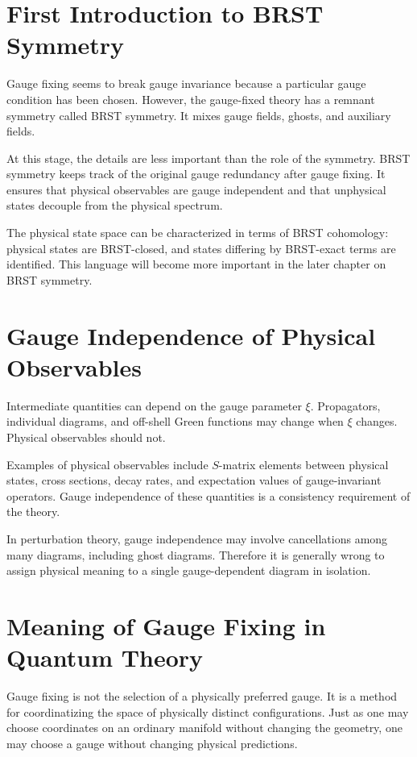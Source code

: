 \section{First Introduction to BRST Symmetry}

Gauge fixing seems to break gauge invariance because a particular gauge
condition has been chosen. However, the gauge-fixed theory has a remnant symmetry
called BRST symmetry. It mixes gauge fields, ghosts, and auxiliary fields.

At this stage, the details are less important than the role of the symmetry.
BRST symmetry keeps track of the original gauge redundancy after gauge fixing. It
ensures that physical observables are gauge independent and that unphysical
states decouple from the physical spectrum.

The physical state space can be characterized in terms of BRST cohomology:
physical states are BRST-closed, and states differing by BRST-exact terms are
identified. This language will become more important in the later chapter on
BRST symmetry.

\section{Gauge Independence of Physical Observables}

Intermediate quantities can depend on the gauge parameter \(\xi\). Propagators,
individual diagrams, and off-shell Green functions may change when \(\xi\)
changes. Physical observables should not.

Examples of physical observables include \(S\)-matrix elements between physical
states, cross sections, decay rates, and expectation values of gauge-invariant
operators. Gauge independence of these quantities is a consistency requirement
of the theory.

In perturbation theory, gauge independence may involve cancellations among many
diagrams, including ghost diagrams. Therefore it is generally wrong to assign
physical meaning to a single gauge-dependent diagram in isolation.

\section{Meaning of Gauge Fixing in Quantum Theory}

Gauge fixing is not the selection of a physically preferred gauge. It is a
method for coordinatizing the space of physically distinct configurations. Just
as one may choose coordinates on an ordinary manifold without changing the
geometry, one may choose a gauge without changing physical predictions.

